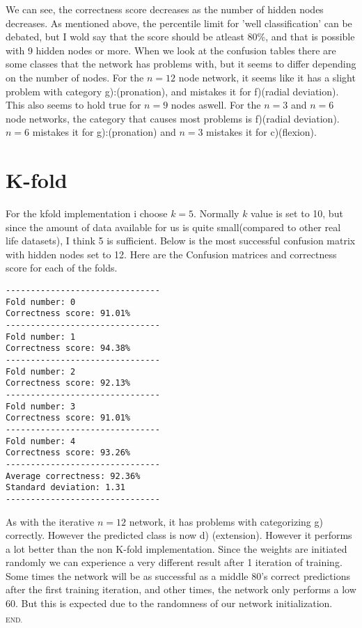\documentclass[a4paper, norsk, 12pt]{article}
\begin{document}
\noindent We can see, the correctness score decreases as the number of hidden nodes decreases. As mentioned above, the percentile limit for 'well classification' can be debated, but I wold say that the score should be atleast 80\%, and that is possible with 9 hidden nodes or more. When we look at the confusion tables there are some classes that the network has problems with, but it seems to differ depending on the number of nodes. For the $n=12$ node network, it seems like it has a slight problem with category g):(pronation), and mistakes it for  f)(radial deviation). This also seems to hold true for $n=9$ nodes aswell. For the $n=3$ and $n=6$ node networks, the category that causes most problems is f)(radial deviation). $n=6$ mistakes it for g):(pronation) and $n=3$ mistakes it for c)(flexion).
\noindent\section{K-fold}
For the kfold implementation i choose $k=5$. Normally $k$ value is set to 10, but since the amount of data available for us is quite small(compared to other real life datasets), I think 5 is sufficient. Below is the most successful confusion matrix with hidden nodes set to 12. Here are the Confusion matrices and correctness score for each of the folds.
\begin{lstlisting}
-------------------------------
Fold number: 0
Correctness score: 91.01%
-------------------------------
Fold number: 1
Correctness score: 94.38%
-------------------------------
Fold number: 2
Correctness score: 92.13%
-------------------------------
Fold number: 3
Correctness score: 91.01%
-------------------------------
Fold number: 4
Correctness score: 93.26%
-------------------------------
Average correctness: 92.36%
Standard deviation: 1.31
-------------------------------
\end{lstlisting}
As with the iterative $n=12$ network, it has problems with categorizing g) correctly. However the predicted class is now d) (extension). However it performs a lot better than the non K-fold implementation. Since the weights are initiated randomly we can experience a very different result after 1 iteration of training. Some times the network will be as successful as a middle 80's correct predictions after the first training iteration, and other times, the network only performs a low 60. But this is expected due to the randomness of our network initialization.

\begin{minipage}{1\linewidth}
\begin{flushright}
$_\text{END.}$
\end{flushright}
\end{minipage}
\end{document}
